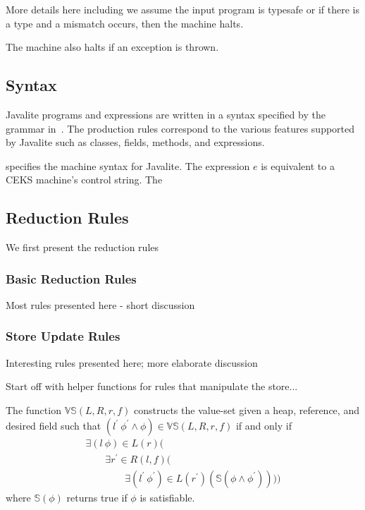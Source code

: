 More details here including we assume the input program is typesafe
or if there is a type and a mismatch occurs, then the machine halts.

The machine also halts if an exception is thrown.

\subsection{Syntax}


 

Javalite programs and expressions are written in a syntax specified by the 
grammar in~. The production rules correspond
to the various features supported by Javalite such as classes, fields,
methods, and expressions. 

 specifies
the machine syntax for Javalite. The expression $e$ is equivalent to
a CEKS machine's control string. The 

\subsection{Reduction Rules}

We first present the reduction rules 


\subsubsection{Basic Reduction Rules}

Most rules presented here - short discussion

\subsubsection{Store Update Rules}

Interesting rules presented here; more elaborate discussion

Start off with helper functions for rules that manipulate the store...

The function $\mathbb{VS}(L,R,r,f)$ constructs the value-set given a
heap, reference, and desired field such that
$(l^\prime\ \phi^\prime\wedge\phi) \in \mathbb{VS}(L,R,r,f)$ if and
only if
\[
\begin{array}{l}
  \exists (l\ \phi) \in L(r) ( \\
  \ \ \ \ \ \ \ \ \ \exists r^\prime \in R(l,f) ( \\
  \ \ \ \ \ \ \ \ \ \ \ \ \ \ \ \ \ \ \exists (l^\prime\ \phi^\prime) \in L(r^\prime) (\mathbb{S}(\phi\wedge\phi^\prime))))
\end{array}
\]
where $\mathbb{S}(\phi)$ returns true if $\phi$ is satisfiable.


